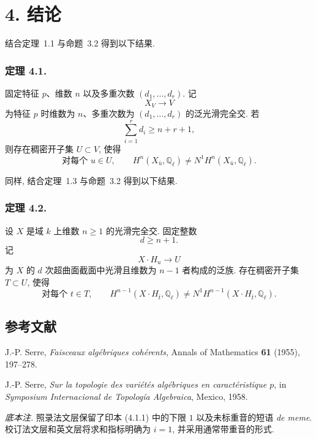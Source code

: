 \section*{4. 结论}

结合定理~1.1 与命题~3.2 得到以下结果.

\subsubsection*{定理 4.1.}
固定特征 $p$、维数 $n$ 以及多重次数 $(d_1,\ldots,d_r)$. 记
\begin{equation}\tag{4.1.0}
X_V\longrightarrow V
\end{equation}
为特征 $p$ 时维数为 $n$、多重次数为 $(d_1,\ldots,d_r)$ 的泛光滑完全交. 若
\begin{equation}\tag{4.1.1}
\sum_{i=1}^{r}d_i\geq n+r+1,
\end{equation}
则存在稠密开子集 $U\subset V$, 使得
\begin{equation}\tag{4.1.2}
\text{对每个 }u\in U,\qquad
H^n(X_{\bar u},\mathbb Q_\ell)\ne N^1H^n(X_{\bar u},\mathbb Q_\ell).
\end{equation}

同样, 结合定理~1.3 与命题~3.2 得到以下结果.

\subsubsection*{定理 4.2.}
设 $X$ 是域 $k$ 上维数 $n\geq1$ 的光滑完全交. 固定整数
\begin{equation}\tag{4.2.1}
d\geq n+1.
\end{equation}
记
\begin{equation}\tag{4.2.2}
X\!\cdot\!H_u\longrightarrow U
\end{equation}
为 $X$ 的 $d$ 次超曲面截面中光滑且维数为 $n-1$ 者构成的泛族.
存在稠密开子集 $T\subset U$, 使得
\begin{equation}\tag{4.2.3}
\text{对每个 }t\in T,\qquad
H^{n-1}(X\!\cdot\!H_{\bar t},\mathbb Q_\ell)
\ne N^1H^{n-1}(X\!\cdot\!H_{\bar t},\mathbb Q_\ell).
\end{equation}

\subsection*{参考文献}

\begin{enumerate}[label={\textup{[\arabic*]}},leftmargin=2.6em]
\item J.-P. Serre, \emph{Faisceaux algébriques cohérents}, Annals of
  Mathematics \textbf{61} (1955), 197--278.
\item J.-P. Serre, \emph{Sur la topologie des variétés algébriques en
  caractéristique $p$}, in \emph{Symposium Internacional de Topología
  Algebraica}, Mexico, 1958.
\end{enumerate}

\medskip
\noindent\emph{底本注.}
照录法文层保留了印本 (4.1.1) 中的下限 $1$ 以及未标重音的短语 \emph{de meme}.
校订法文层和英文层将求和指标明确为 $i=1$, 并采用通常带重音的形式.
